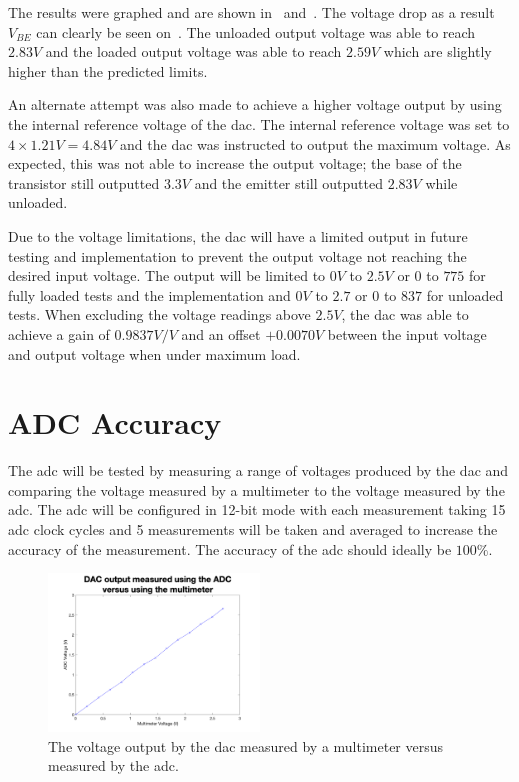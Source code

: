 The results were graphed and are shown in~ and~.
The voltage drop as a result $V_{BE}$ can clearly be seen on~.
The unloaded output voltage was able to reach $2.83V$ and the loaded output voltage was able to reach $2.59V$ which are slightly higher than the predicted limits.

An alternate attempt was also made to achieve a higher voltage output by using the internal reference voltage of the \gls{dac}.
The internal reference voltage was set to $4 \times 1.21V = 4.84V$ and the \gls{dac} was instructed to output the maximum voltage.
As expected, this was not able to increase the output voltage; the base of the transistor still outputted $3.3V$ and the emitter still outputted $2.83V$ while unloaded.

Due to the voltage limitations, the \gls{dac} will have a limited output in future testing and implementation to prevent the output voltage not reaching the desired input voltage.
The output will be limited to $0V$ to $2.5V$ or $0$ to $775$ for fully loaded tests and the implementation and $0V$ to $2.7$ or $0$ to $837$ for unloaded tests.
When excluding the voltage readings above $2.5V$, the \gls{dac} was able to achieve a gain of $0.9837V/V$ and an offset $+0.0070V$ between the input voltage and output voltage when under maximum load. 

\section{ADC Accuracy}\label{sec:adc-accuracy}

The \gls{adc} will be tested by measuring a range of voltages produced by the \gls{dac} and comparing the voltage measured by a multimeter to the voltage measured by the \gls{adc}.
The \gls{adc} will be configured in 12-bit mode with each measurement taking 15 \gls{adc} clock cycles and 5 measurements will be taken and averaged to increase the accuracy of the measurement.
The accuracy of the \gls{adc} should ideally be $100\%$.

\begin{figure}[!ht]
    \centering
    \includegraphics[width=0.5\textwidth]{Figures/Testing/ADC}
    \caption{The voltage output by the \gls{dac} measured by a multimeter versus measured by the \gls{adc}.}
    \label{fig:adc-accuracy} %
\end{figure}


